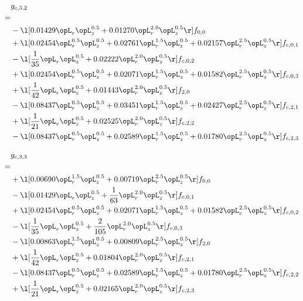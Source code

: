 \begin{alignat}{2} 
\label{eq:g_32_0} 
& g_{c,3,2} \nonumber \\ 
 = \\ 
& - \l[  0.01429 \opL_r \opL_z^{0.5} +  0.01270 \opL_r^{2.0} \opL_z^{0.5}  \r] f_{0,0} \nonumber \\ 
& + \l[  0.02454 \opL_r^{0.5} \opL_z^{0.5} +  0.02761 \opL_r^{1.5} \opL_z^{0.5} +  0.02157 \opL_r^{2.5} \opL_z^{0.5}  \r] f_{c,0,1} \nonumber \\ 
& - \l[ \frac{1}{35} \opL_r \opL_z^{0.5} +  0.02222 \opL_r^{2.0} \opL_z^{0.5}  \r] f_{c,0,2} \nonumber \\ 
& + \l[  0.02454 \opL_r^{0.5} \opL_z^{0.5} +  0.02071 \opL_r^{1.5} \opL_z^{0.5} +  0.01582 \opL_r^{2.5} \opL_z^{0.5}  \r] f_{c,0,3} \nonumber \\ 
& + \l[ \frac{1}{42} \opL_r \opL_z^{0.5} +  0.01443 \opL_r^{2.0} \opL_z^{0.5}  \r] f_{2,0} \nonumber \\ 
& - \l[  0.08437 \opL_r^{0.5} \opL_z^{0.5} +  0.03451 \opL_r^{1.5} \opL_z^{0.5} +  0.02427 \opL_r^{2.5} \opL_z^{0.5}  \r] f_{c,2,1} \nonumber \\ 
& + \l[ \frac{1}{21} \opL_r \opL_z^{0.5} +  0.02525 \opL_r^{2.0} \opL_z^{0.5}  \r] f_{c,2,2} \nonumber \\ 
& - \l[  0.08437 \opL_r^{0.5} \opL_z^{0.5} +  0.02589 \opL_r^{1.5} \opL_z^{0.5} +  0.01780 \opL_r^{2.5} \opL_z^{0.5}  \r] f_{c,2,3} \nonumber \\ 
\end{alignat} 


\begin{alignat}{2} 
\label{eq:g_33_0} 
& g_{c,3,3} \nonumber \\ 
 = \\ 
& + \l[  0.00690 \opL_r^{1.5} \opL_z^{0.5} +  0.00719 \opL_r^{2.5} \opL_z^{0.5}  \r] f_{0,0} \nonumber \\ 
& - \l[  0.01429 \opL_r \opL_z^{0.5} + \frac{1}{63} \opL_r^{2.0} \opL_z^{0.5}  \r] f_{c,0,1} \nonumber \\ 
& + \l[  0.02454 \opL_r^{0.5} \opL_z^{0.5} +  0.02071 \opL_r^{1.5} \opL_z^{0.5} +  0.01582 \opL_r^{2.5} \opL_z^{0.5}  \r] f_{c,0,2} \nonumber \\ 
& - \l[ \frac{1}{35} \opL_r \opL_z^{0.5} + \frac{2}{105} \opL_r^{2.0} \opL_z^{0.5}  \r] f_{c,0,3} \nonumber \\ 
& - \l[  0.00863 \opL_r^{1.5} \opL_z^{0.5} +  0.00809 \opL_r^{2.5} \opL_z^{0.5}  \r] f_{2,0} \nonumber \\ 
& + \l[ \frac{1}{42} \opL_r \opL_z^{0.5} +  0.01804 \opL_r^{2.0} \opL_z^{0.5}  \r] f_{c,2,1} \nonumber \\ 
& - \l[  0.08437 \opL_r^{0.5} \opL_z^{0.5} +  0.02589 \opL_r^{1.5} \opL_z^{0.5} +  0.01780 \opL_r^{2.5} \opL_z^{0.5}  \r] f_{c,2,2} \nonumber \\ 
& + \l[ \frac{1}{21} \opL_r \opL_z^{0.5} +  0.02165 \opL_r^{2.0} \opL_z^{0.5}  \r] f_{c,2,3} \nonumber \\ 
\end{alignat} 


